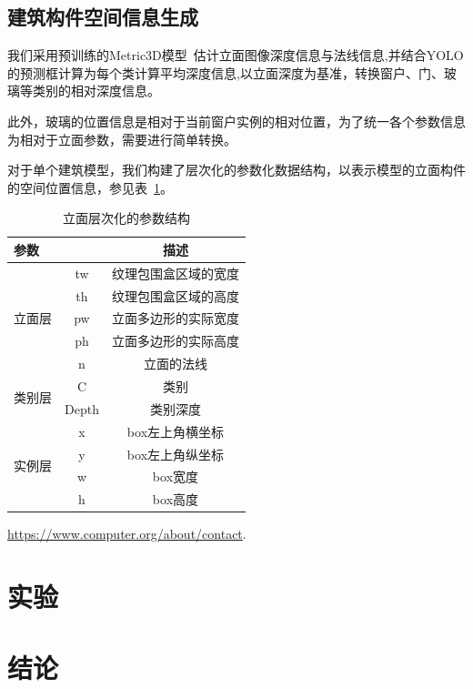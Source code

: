 \documentclass[10pt,twocolumn,letterpaper]{article}
\begin{document}
\subsection{建筑构件空间信息生成}
我们采用预训练的Metric3D模型~\cite{yin2023metric3d,hu2024metric3d}估计立面图像深度信息与法线信息,并结合YOLO的预测框计算为每个类计算平均深度信息,以立面深度为基准，转换窗户、门、玻璃等类别的相对深度信息。

此外，玻璃的位置信息是相对于当前窗户实例的相对位置，为了统一各个参数信息为相对于立面参数，需要进行简单转换。

对于单个建筑模型，我们构建了层次化的参数化数据结构，以表示模型的立面构件的空间位置信息，参见表~\ref{tab:facadePara}。
\begin{table}
  \centering
  \begin{tabular}{@{}lcc@{}}
    \toprule
    参数 & & 描述 \\
    \midrule
    \multirow{5}{*}{立面层} & tw & 纹理包围盒区域的宽度 \\ %
                            & th & 纹理包围盒区域的高度 \\
                            & pw & 立面多边形的实际宽度 \\
                            & ph & 立面多边形的实际高度 \\
                            & n & 立面的法线 \\
    \multirow{2}{*}{类别层} & C& 类别 \\ %
                            & Depth & 类别深度 \\
    \multirow{4}{*}{实例层} & x& box左上角横坐标 \\ %
                            & y &  box左上角纵坐标 \\                                
                            & w & box宽度 \\                                
                            & h & box高度 \\                                
    \bottomrule
  \end{tabular}
  \caption{立面层次化的参数结构}
  \label{tab:facadePara}
\end{table}
\url{https://www.computer.org/about/contact}.
\section{实验}

\section{结论}
{\small


}
\end{document}
